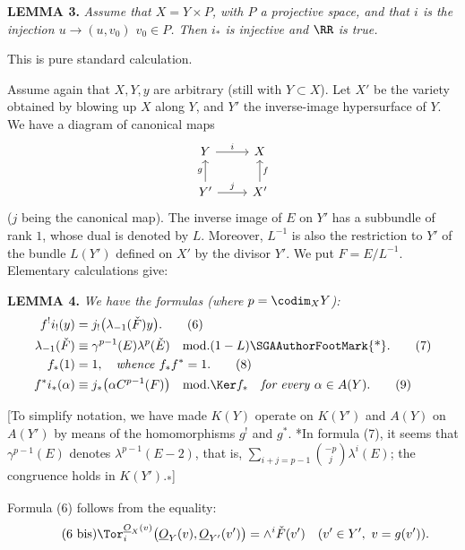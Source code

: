 \textbf{LEMMA 3.} \emph{Assume that \(X=Y\times P\), with \(P\) a projective space, and that \(i\) is the injection \(u\longrightarrow (u,v_0)\) \(v_0\in P\). Then \(i_*\) is injective and \(\RR\) is true.}

This is pure standard calculation.

Assume again that \(X,Y,y\) are arbitrary (still with \(Y\subset X\)). Let \(X'\) be the variety obtained by blowing up \(X\) along \(Y\), and \(Y'\) the inverse-image hypersurface of \(Y\). We have a diagram of canonical maps
\[
\begin{tikzcd}
Y \arrow[r,"i"] & X\\
Y' \arrow[u,"g"] \arrow[r,"j"] & X' \arrow[u,"f"']
\end{tikzcd}
\]
(\(j\) being the canonical map). The inverse image of \(E\) on \(Y'\) has a subbundle of rank \(1\), whose dual is denoted by \(L\). Moreover, \(L^{-1}\) is also the restriction to \(Y'\) of the bundle \(L(Y')\) defined on \(X'\) by the divisor \(Y'\). We put \(F=E/L^{-1}\). Elementary calculations give:

%
\textbf{LEMMA 4.} \emph{We have the formulas (where \(p=\codim_XY\)):}
\begin{align}
  f^!i_!(y)&=j_!\bigl(\lambda_{-1}(\check F)y\bigr). \tag{6}\\
  \lambda_{-1}(\check F)&\equiv \gamma^{p-1}(E)\lambda^p(\check E)
    \quad\text{mod.}(1-L)\text{\SGAAuthorFootMark{*}}. \tag{7}\\
  f_*(1)&=1,\quad\text{\emph{whence} }f_*f^*=1. \tag{8}\\
  f^*i_*(\alpha)&\equiv j_*\bigl(\alpha C^{p-1}(F)\bigr)
    \quad\text{mod.}\Ker f_*\quad\text{\emph{for every} }\alpha\in A(Y). \tag{9}
\end{align}

[To simplify notation, we have made \(K(Y)\) operate on \(K(Y')\) and \(A(Y)\) on \(A(Y')\) by means of the homomorphisms \(g^!\) and \(g^*\). {*}In formula (7), it seems that \(\gamma^{p-1}(E)\) denotes \(\lambda^{p-1}(E-2)\), that is, \(\sum_{i+j=p-1}\binom{-p}{j}\lambda^i(E)\); the congruence holds in \(K(Y')\).\textsubscript{*}]

Formula (6) follows from the equality:
\begin{equation}\tag{6 bis}
  \Tor_i^{\underline{O}_X(v)}\bigl(\underline{O}_Y(v),\underline{O}_{Y'}(v')\bigr)
  =
  \wedge^i\check F(v')
  \quad (v'\in Y',\ v=g(v')).
\end{equation}

